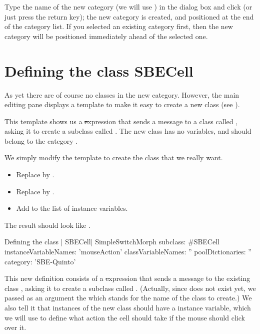 \documentclass[a4paper,10pt,twoside]{book}
\begin{document}
Type the name of the new category (we will use ) in the dialog box and click  (or just press the return key); the new category is created, and positioned at the end of the category list.
If you selected an existing category first, then the new category will be positioned immediately ahead of the selected one.

\section{Defining the class SBECell}

As yet there are  of course no classes in the new category. However, the main editing pane displays a template to make it easy to create a new class (see ).

This template shows us a \st expression that sends a message to a class called , asking it to create a subclass called .  The new class has no variables, and should belong to the category .

We simply modify the template to create the class that we really want.

\begin{itemize}
  \item Replace  by .
  \item Replace  by .
  \item Add  to the list of instance variables.
\end{itemize}
The result should look like .

\begin{classdef}[firstClassDef]{Defining the class \ct| SBECell|}
SimpleSwitchMorph subclass: #SBECell
   instanceVariableNames: 'mouseAction'
   classVariableNames: ''
   poolDictionaries: ''
   category: 'SBE-Quinto'
\end{classdef}

This new definition consists of a \st expression that sends a message to the existing class , asking it to create a subclass called .
(Actually, since  does not exist yet, we passed as an argument the   which stands for the name of the class to create.)
We also tell it that instances of the new class should have a  instance variable, which we will use to define what action the cell should take if the mouse should click over it.
\end{document}
